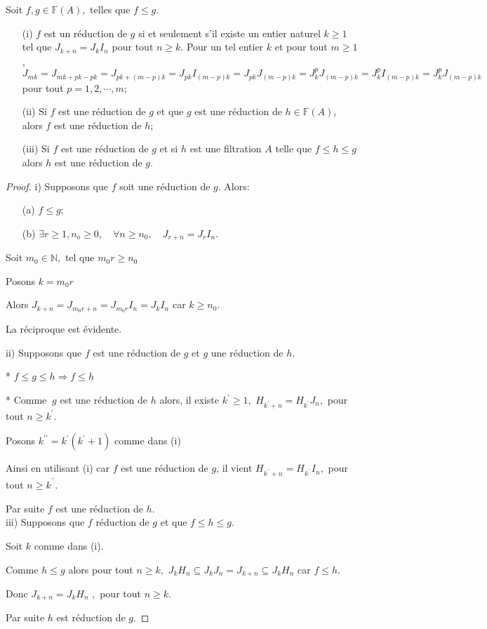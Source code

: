 \begin{maproposition}
	Soit $f,g \in \mathbb{F}(A),$ telles que $f \leqslant g$.
	\begin{enumerate}
		\label{maprop4}
		\item[(i)] $f$ est un réduction de $g$ si et seulement s'il existe un entier naturel $k \geqslant 1$ tel que $J_{k+n}  = J_{k}I_n$ pour tout $n \geqslant k$. Pour un tel entier $k$ et pour tout $m \geqslant 1$, $J_{mk}=J_{mk+pk-pk}=J_{pk+(m-p)k}=J_{pk}I_{(m-p)k}=J_{pk}J_{(m-p)k}=J_{k}^{p}J_{(m-p)k}=J_{k}^{p}I_{(m-p)k}=J_{k}^{p}J_{(m-p)k}
		$ pour tout $p=1,2,\cdots,m$;
		\item[(ii)] Si $f$ est une réduction de $g$ et que $g$ est une réduction de $h \in \mathbb{F}(A)$, alors $f$ est une réduction de $h$;
		\item[(iii)] Si $f$ est une réduction de $g$ et si $h$ est une filtration $A$ telle que $f \leqslant h \leqslant g$ alors $h$ est une réduction de $g$.
	\end{enumerate}
\end{maproposition}
\begin{proof}
	i) Supposons que $f$ soit une réduction de $g$. Alors:
	\begin{enumerate}
		\item[(a)] $f \leqslant g$;
		\item[(b)] $\exists r \geqslant 1,n_o \geqslant 0 ,\quad \forall n \geqslant n_0,\quad J_{r+n}= J_r I_n $.
	\end{enumerate}
	Soit $m_{0}\in \mathbb{N},$ tel que $m_{0}r\geq n_{0}$
	
	Posons $k=m_{0}r$
	
	Alors $J_{k+n}=J_{m_{0}r+n}=J_{m_{0}r}I_{n}=J_{k}I_{n}$ car $k\geq n_{0}.$
	
	La réciproque est évidente.
	
	ii) Supposons que $f$ est une réduction de $g$ et $g$ une réduction
	de $h.$
	
	* $f\leq g\leq h\Rightarrow f\leq h$
	
	* Comme $\ g$ est une réduction de $h$ alors, il existe $k^{\prime }\geq
	1,$ $H_{k^{\prime }+n}=H_{k^{\prime }}J_{n},$ pour tout $n\geq k^{\prime }.$
	
	Posons $k^{\prime \prime }=k^{\prime }(k^{\prime }+1)$ comme dans (i)
	
	Ainsi en utilisant (i) car $f$ est une réduction de $g$, il vient  $H_{k^{^{\prime \prime }}+n}=H_{k^{^{\prime \prime }}}I_{n},$ pour tout $n\geq k^{^{\prime \prime }}.$
	
	Par suite $f$ est une réduction de $h$. \\
	
	iii) Supposons que $f$ réduction de $g$ et que $f\leq h\leq g.$
	
	Soit $k$ comme dans (i).
	
	Comme $h\leq g$ alors pour tout $n\geq k,$ $J_{k}H_{n}\subseteq
	J_{k}J_{n}=J_{k+n}\subseteq J_{k}H_{n}$ car $f\leq h.$
	
	Donc $J_{k+n}=J_{k}H_{n}$ $,$ pour tout $n\geq k.$
	
	Par suite $h$ est réduction de $g.$
\end{proof}


